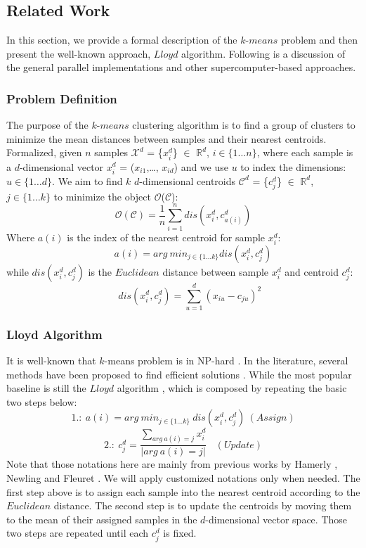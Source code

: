 \documentclass[10pt,journal,compsoc]{IEEEtran}
\begin{document}
\subsection{Related Work}




In this section, we provide a formal description of the $k$-$means$ problem and then present the well-known approach, $Lloyd$ algorithm. Following is a discussion of the general parallel implementations and other supercomputer-based approaches.


\subsubsection{Problem Definition}
The purpose of the $k$-$means$ clustering algorithm is to find a group of clusters to minimize the mean distances between samples and their nearest centroids. Formalized, given $n$ samples {$\mathcal{X}^d$} = \{$x^d_i$\} $\in$ $\mathds{R}^d$, $i \in \{1\ldots n\}$, where each sample is a $d$-dimensional vector $x^d_i$ = ($x_{i1}$,\ldots, $x_{id}$) and we use $u$ to index the dimensions: $u \in \{ 1\ldots d \}$. We aim to find $k$ $d$-dimensional centroids {$\mathcal{C}^d$} = \{$c^d_j$\} $\in$ $\mathds{R}^d$, $j \in \{1 \ldots k\}$ to minimize the object $\mathcal{O}$($\mathcal{C}$):
$$  \mathcal{O}(\mathcal{C}) =    \frac{1}{n}\sum^{n}_{i=1} dis(x^d_i, c^d_{a(i)})   $$
Where $a(i)$ is the index of the nearest centroid for sample $x^d_i$:
$$ \ \ \ \ \ \ \ \ \ a(i)= arg\ min_{j\in \{1 \ldots k \} } dis({x^d_i}, c^d_j) $$
while $dis(x^d_i, c^d_j)$ is the $Euclidean$ distance between sample $x^d_i$ and centroid $c^d_j$:
$$ \ \ \ \ \ \ dis(x^d_i, c^d_j) = \sum^{d}_{u=1}(x_{iu}-c_{ju})^2 $$

\subsubsection{Lloyd Algorithm}
It is well-known that $k$-means problem is in NP-hard \cite{newling2016nested}. In the literature, several methods have been proposed to find efficient solutions \cite{newling2016fast,newling2016nested,ding2015yinyang,curtin2017dual,shen2017compressed,bottesch2016speeding}. While the most popular baseline is still the $Lloyd$ algorithm \cite{lloyd1982least}, which is composed by repeating the basic two steps below:
$$1.:\ a(i) = arg\ min_{j\in \{1 \ldots k \} }\ dis({x^d_i}, c^d_j)\ (Assign)$$
$$2.:\ c^d_j = \frac{\sum_{arg\ a(i)=j}x^d_i}{| arg\ a(i)=j |}\ \ \ \ (Update) $$
Note that those notations here are mainly from previous works by Hamerly \cite{hamerly2010making}, Newling and Fleuret \cite{newling2016fast}. We will apply customized notations only when needed. 
The first step above is to assign each sample into the nearest centroid according to the $Euclidean$ distance. The second step is to update the centroids by moving them to the mean of their assigned samples in the $d$-dimensional vector space. Those two steps are repeated until each $c^d_j$ is fixed. %
\end{document}
